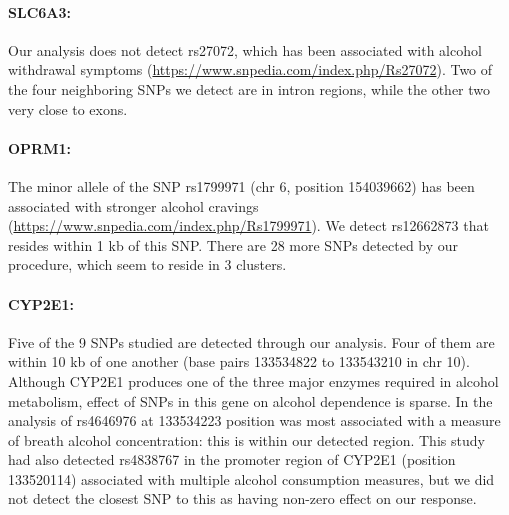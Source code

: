 \paragraph{SLC6A3:} Our analysis does not detect rs27072, which has been associated with alcohol withdrawal symptoms (\url{https://www.snpedia.com/index.php/Rs27072}). Two of the four neighboring SNPs we detect are in intron regions, while the other two very close to exons.

\paragraph{OPRM1:} The minor allele of the SNP rs1799971 (chr 6, position 154039662) has been associated with stronger alcohol cravings (\url{https://www.snpedia.com/index.php/Rs1799971}). We detect rs12662873 that resides within 1 kb of this SNP. There are 28 more SNPs detected by our procedure, which seem to reside in 3 clusters.

\paragraph{CYP2E1:} Five of the 9 SNPs studied are detected through our analysis. Four of them are within 10 kb of one another (base pairs 133534822 to 133543210 in chr 10). Although CYP2E1 produces one of the three major enzymes required in alcohol metabolism, effect of SNPs in this gene on alcohol dependence is sparse. In the analysis of \cite{LindEtal12} rs4646976 at 133534223 position was most associated with a measure of breath alcohol concentration: this is within our detected region. This study had also detected rs4838767 in the promoter region of CYP2E1 (position 133520114) associated with multiple alcohol consumption measures, but we did not detect the closest SNP to this as having non-zero effect on our response.

